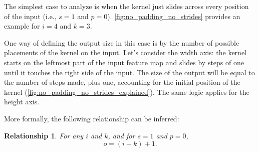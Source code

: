 \documentclass[notitlepage]{report}
\newtheorem{relationship}{Relationship}
\begin{document}
The simplest case to analyze is when the kernel just slides across every
position of the input (i.e., $s = 1$ and $p = 0$).
\autoref{fig:no_padding_no_strides} provides an example for $i = 4$ and $k =
3$.

One way of defining the output size in this case is by the number of possible
placements of the kernel on the input. Let's consider the width axis: the kernel
starts on the leftmost part of the input feature map and slides by steps of one
until it touches the right side of the input. The size of the output will be
equal to the number of steps made, plus one, accounting for the initial position
of the kernel (\autoref{fig:no_padding_no_strides_explained}). The same logic
applies for the height axis.

More formally, the following relationship can be inferred:

\begin{relationship}\label{rel:no_padding_no_strides}
For any $i$ and $k$, and for $s = 1$ and $p = 0$,
\begin{equation*}
    o = (i - k) + 1.
\end{equation*}
\end{relationship}
\end{document}
